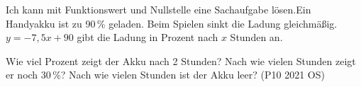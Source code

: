 \begin{aufgabe}{Ich kann mit Funktionswert und Nullstelle eine Sachaufgabe lösen.\newline Ein Handyakku ist zu 90\,\% geladen. Beim Spielen sinkt die Ladung gleichmäßig. $y = -7{,}5x + 90$ gibt die Ladung in Prozent nach $x$ Stunden an.}
\begin{teile}
\teil Wie viel Prozent zeigt der Akku nach 2 Stunden? \quad \leerfeld[\%]
\teil Nach wie vielen Stunden zeigt er noch 30\,\%? \quad \leerfeld[h]
\teil Nach wie vielen Stunden ist der Akku leer? (P10 2021 OS) \quad \leerfeld[h]
\end{teile}
\end{aufgabe}
